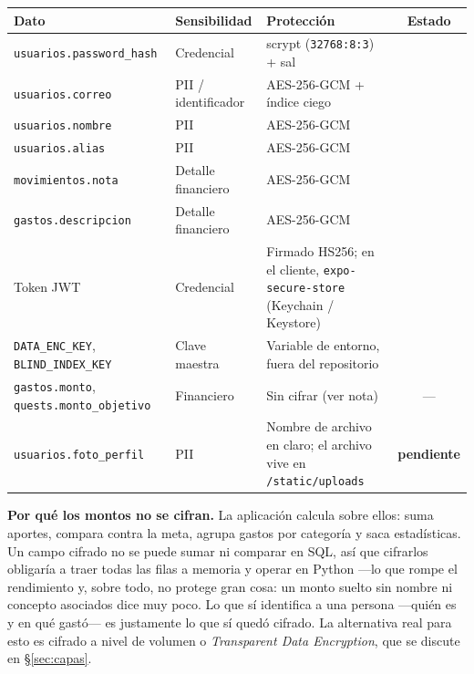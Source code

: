 \documentclass[11pt,letterpaper]{article}
\newcommand{\ok}{\textcolor{qcGreen}{\textbf{\checkmark}}}
\newcommand{\pend}{\textcolor{qcAmber}{\textbf{pendiente}}}
\begin{document}
\begin{center}
\small
\begin{tabular}{@{}>{\raggedright\arraybackslash}p{4.6cm} >{\raggedright\arraybackslash}p{2.4cm} >{\raggedright\arraybackslash}p{4.6cm} c@{}}
\toprule
\textbf{Dato} & \textbf{Sensibilidad} & \textbf{Protección} & \textbf{Estado} \\
\midrule
\texttt{usuarios.password\_hash} & Credencial   & scrypt (\texttt{32768:8:3}) + sal   & \ok \\
\texttt{usuarios.correo}         & PII / identificador & AES-256-GCM + índice ciego  & \ok \\
\texttt{usuarios.nombre}         & PII          & AES-256-GCM                        & \ok \\
\texttt{usuarios.alias}          & PII          & AES-256-GCM                        & \ok \\
\texttt{movimientos.nota}        & Detalle financiero & AES-256-GCM                  & \ok \\
\texttt{gastos.descripcion}      & Detalle financiero & AES-256-GCM                  & \ok \\
Token JWT                        & Credencial   & Firmado HS256; en el cliente, \texttt{expo-secure-store} (Keychain / Keystore) & \ok \\
\texttt{DATA\_ENC\_KEY}, \texttt{BLIND\_INDEX\_KEY} & Clave maestra & Variable de entorno, fuera del repositorio & \ok \\
\midrule
\texttt{gastos.monto}, \texttt{quests.monto\_objetivo} & Financiero & Sin cifrar (ver nota) & --- \\
\texttt{usuarios.foto\_perfil}   & PII          & Nombre de archivo en claro; el archivo vive en \texttt{/static/uploads} & \pend \\
\bottomrule
\end{tabular}
\end{center}

\begin{nota}
\textbf{Por qué los montos no se cifran.} La aplicación calcula sobre ellos:
suma aportes, compara contra la meta, agrupa gastos por categoría y saca
estadísticas. Un campo cifrado no se puede sumar ni comparar en SQL, así que
cifrarlos obligaría a traer todas las filas a memoria y operar en Python
—lo que rompe el rendimiento y, sobre todo, no protege gran cosa: un monto
suelto sin nombre ni concepto asociados dice muy poco. Lo que sí identifica a
una persona —quién es y en qué gastó— es justamente lo que sí quedó cifrado.
La alternativa real para esto es cifrado a nivel de volumen o \emph{Transparent
Data Encryption}, que se discute en \S\ref{sec:capas}.
\end{nota}
\end{document}
